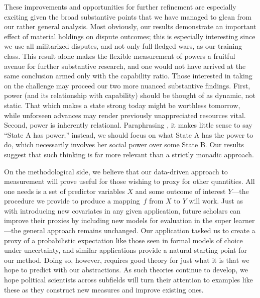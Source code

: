 These improvements and opportunities for further refinement are especially exciting given the broad substantive points that we have managed to glean from our rather general analysis.
Most obviously, our results demonstrate an important effect of material holdings on dispute outcomes; this is especially interesting since we use all militarized disputes, and not only full-fledged wars, as our training class.
This result alone makes the flexible measurement of powers a fruitful avenue for further substantive research, and one would not have arrived at the same conclusion armed only with the capability ratio.
Those interested in taking on the challenge may proceed our two more nuanced substantive findings.
First, power (and its relationship with capability) should be thought of as dynamic, not static.  
That which makes a state strong today might be worthless tomorrow, while unforseen advances may render previously unappreciated resources vital.
Second, power is inherently relational. 
Paraphrasing \citet[4]{dowding1996}, it makes little sense to say ``State A has power;'' instead, we should focus on what State A has the power to do, which necessarily involves her social power over some State B.
Our results suggest that such thinking is far more relevant than a strictly monadic approach.

On the methodological side, we believe that our data-driven approach to measurement will prove useful for those wishing to proxy for other quantities.
All one needs is a set of predictor variables $X$ and some outcome of interest $Y$---the procedure we provide to produce a mapping~$f$ from $X$ to $Y$ will work.
Just as with introducing new covariates in any given application, future scholars can improve their proxies by including new models for evaluation in the super learner---the general approach remains unchanged.
Our application tasked us to create a proxy of a probabilistic expectation like those seen in formal models of choice under uncertainty, and similar applications provide a natural starting point for our method.
Doing so, however, requires good theory for just what it is that we hope to predict with our abstractions. 
As such theories continue to develop, we hope political scientists across subfields will turn their attention to examples like these as they construct new measures and improve existing ones.

